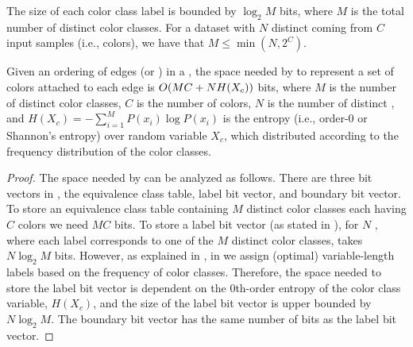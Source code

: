 \begin{lemma}
  The size of each color class label is bounded by $\log_2{M}$ bits, where
  $M$ is the total number of distinct color classes. For a dataset with $N$
  distinct \kmers coming from $C$ input samples (i.e., colors), we have that $M
  \leq \min(N,2^C)$.
  \label{label-size-bound}
\end{lemma}


\begin{theorem}
Given an ordering of edges (or \kmers) in a \dbg, the space needed by \system to
represent a set of colors attached to each edge is $O(MC+N H(X_c))$ bits,
where $M$ is the number of distinct color classes, $C$ is the number of colors,
$N$ is the number of distinct \kmers, and $H(X_c) = -\sum_{i=1}^{M} P(x_i)\log
P(x_i)$ is the entropy (i.e., order-$0$ or Shannon's entropy) over random
variable $X_c$, which distributed according to the frequency distribution of the
color classes.
\label{space-bound} \end{theorem}

\begin{proof}
%
The space needed by \system can be analyzed as follows. There are three bit
vectors in \system, the equivalence class table, label bit vector, and boundary bit
vector. To store an equivalence class table containing $M$ distinct color
classes each having $C$ colors we need $MC$ bits. To store a label bit vector
(as stated in ), for $N$ \kmers, where each label
corresponds to one of the $M$ distinct color classes, takes $N\log_2{M}$ bits.
However, as explained in , in \system we assign (optimal) variable-length
labels based on the frequency of color classes. Therefore, the space needed to
store the label bit vector is dependent on the $0$th-order entropy of the color
class variable, $H(X_c)$, and the size of the label bit vector is upper bounded
by $N\log_2{M}$.  The boundary bit vector has the same number of bits as the
label bit vector. 
%
\end{proof}



